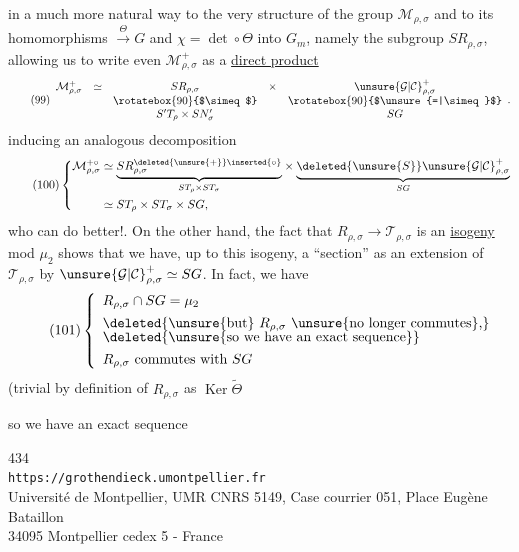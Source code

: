 
 in a much more natural way to the very structure
of the group $\mathcal{M}_{\rho,\sigma}$ and to its homomorphisms
$\xrightarrow{\Theta}G$ and $\chi=\det\circ\Theta$ into $G_m$, namely the
 subgroup $SR_{\rho,\sigma}$, allowing us to write
even $\mathcal{M}_{\rho,\sigma}^{+}$ as a
\uline{direct product}
\[
\tag{99}
\begin{array}{rccccc}
\mathcal{M}_{\rho,\sigma}^{+}&\simeq&SR_{\rho,\sigma}&\times&
 \unsure{\mathcal{G}|\mathcal{C}}_{\rho,\sigma}^{+}\\
&&\rotatebox{90}{$\simeq$}&&\rotatebox{90}{$\unsure{=|\simeq}$}\\
&&S'T_\rho\times SN'_\sigma&&SG
\end{array}
.
\]
inducing an analogous decomposition
\[
\tag{100}
\left\{
\begin{aligned}
\mathcal{M}_{\rho,\sigma}^{+\circ}
 &\simeq \underset{ST_\rho\times ST_\sigma}{\underbrace{
 SR_{\rho,\sigma}^{\deleted{\unsure{+}}\inserted{\circ}}}}
 \times
 \underset{SG}{\underbrace{\deleted{\unsure{S}}\unsure{\mathcal{G}|\mathcal{C}}_{\rho,\sigma}^{+}}}\\
 &\simeq ST_\rho\times ST_\sigma\times SG,
\end{aligned}
\right.
\]
who can do better!. On the other hand, the fact that
$R_{\rho,\sigma}\longrightarrow\mathcal{T}_{\rho,\sigma}$ is an
\uline{isogeny} mod $\mu_2$ shows that we have, up to this isogeny, a
``section'' 
as an extension of $\mathcal{T}_{\rho,\sigma}$ by
$\unsure{\mathcal{G}|\mathcal{C}}_{\rho,\sigma}^{+}\simeq SG$.
In fact, we have
\[
\tag{101}
\left\{
\begin{array}{l}
R_{\rho,\sigma}\cap SG=\mu_2\\[4pt]
\deleted{\text{\unsure{but} }R_{\rho,\sigma}\text{ \unsure{no longer commutes},}}\\[-2pt]
\deleted{\text{\unsure{so we have an exact sequence}}}\\[4pt]
R_{\rho,\sigma}\text{ commutes with }SG
\end{array}
\right.
\]
\hfill (trivial by definition of $R_{\rho,\sigma}$ as
$\operatorname{Ker}\widetilde{\Theta}$

so we have an exact sequence


\begin{center}
{\small
434\\
\texttt{https://grothendieck.umontpellier.fr}\\
Université de Montpellier, UMR CNRS 5149, Case courrier 051, Place Eugène Bataillon\\
34095 Montpellier cedex 5 - France
}
\end{center}

